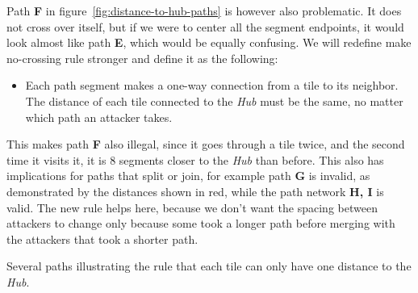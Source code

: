 Path \textbf{F} in figure~\ref{fig:distance-to-hub-paths} is however also problematic.
It does not cross over itself, but if we were to center all the segment endpoints, it would look almost like path \textbf{E}, which would be equally confusing.
We will redefine make no-crossing rule stronger and define it as the following:
\begin{itemize}
    \item Each path segment makes a one-way connection from a tile to its neighbor.
          The distance of each tile connected to the \emph{Hub} must be the same, no matter which path an attacker takes.
\end{itemize}
This makes path \textbf{F} also illegal, since it goes through a tile twice, and the second time it visits it, it is 8 segments closer to the \emph{Hub} than before.
This also has implications for paths that split or join, for example path \textbf{G} is invalid, as demonstrated by the distances shown in red, while the path network \textbf{H, I} is valid.
The new rule helps here, because we don't want the spacing between attackers to change only because some took a longer path before merging with the attackers that took a shorter path.

\begin{center}
    \captionsetup{type=figure}
    \caption{Several paths illustrating the rule that each tile can only have one distance to the \emph{Hub}.}
    \label{fig:distance-to-hub-paths}
\end{center}


